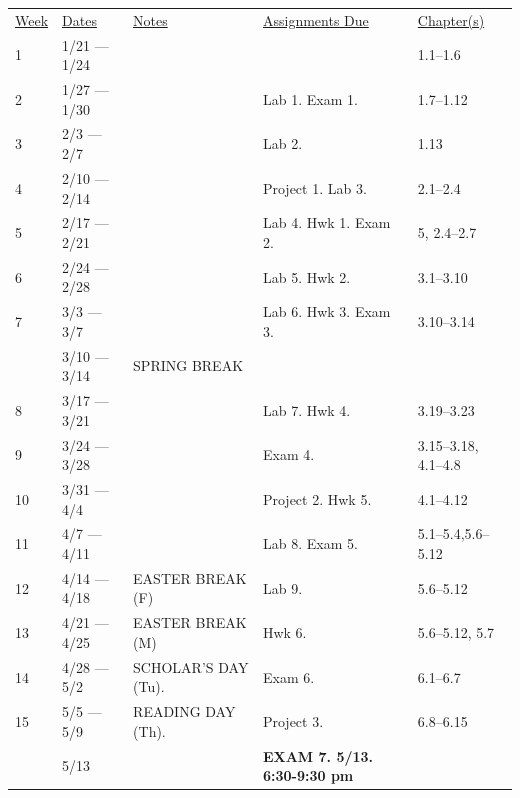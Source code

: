 \documentclass[10pt]{article}
\begin{document}
\begin{center}
\begin{tabular}{lllll}
\underline{Week} & \underline{Dates} & \underline{Notes} & \underline{Assignments Due} & \underline{Chapter(s)}\\
1 & 1/21 --- 1/24 & &  & 1.1--1.6 \\
2 & 1/27 --- 1/30 &  & Lab 1. Exam 1. & 1.7--1.12  \\
3 & 2/3 --- 2/7 & & Lab 2. & 1.13  \\
4 & 2/10 --- 2/14 & & Project 1. Lab 3. & 2.1--2.4 \\
5 & 2/17 --- 2/21 & & Lab 4. Hwk 1. Exam 2. & 5, 2.4--2.7 \\
6 & 2/24 --- 2/28 & & Lab 5. Hwk 2. & 3.1--3.10 \\
7 & 3/3 --- 3/7 &  &  Lab 6. Hwk 3. Exam 3. & 3.10--3.14 \\
 & 3/10 --- 3/14 & SPRING BREAK & &  \\
8 & 3/17 --- 3/21 & & Lab 7. Hwk 4.  & 3.19--3.23\\
9 & 3/24 --- 3/28 & & Exam 4. & 3.15--3.18, 4.1--4.8 \\
10 & 3/31 --- 4/4 &  &  Project 2. Hwk 5.  & 4.1--4.12 \\
11 & 4/7 --- 4/11 &  & Lab 8. Exam 5. & 5.1--5.4,5.6--5.12\\
12 & 4/14 --- 4/18 & EASTER BREAK (F) & Lab 9. & 5.6--5.12 \\
13 & 4/21 --- 4/25 & EASTER BREAK (M) & Hwk 6. & 5.6--5.12, 5.7 \\
14 & 4/28 --- 5/2 & SCHOLAR'S DAY (Tu). & Exam 6. & 6.1--6.7 \\
15 & 5/5 --- 5/9 & READING DAY (Th). & Project 3. & 6.8--6.15\\
 & 5/13 &   & \textbf{EXAM 7. 5/13. 6:30-9:30 pm} & 
\end{tabular}
\end{center}
\end{document}
